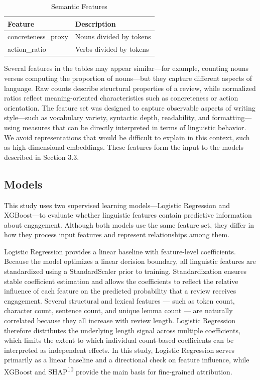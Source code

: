 \documentclass[12pt]{article}
\begin{document}
\begin{longtable}{ll}
\caption{Semantic Features} \\
\textbf{Feature} & \textbf{Description} \\
\hline
concreteness\_proxy & Nouns divided by tokens \\
action\_ratio & Verbs divided by tokens \\
\end{longtable}

Several features in the tables may appear similar—for example, counting nouns versus computing the proportion of nouns—but they capture different aspects of language. Raw counts describe structural properties of a review, while normalized ratios reflect meaning-oriented characteristics such as concreteness or action orientation. The feature set was designed to capture observable aspects of writing style—such as vocabulary variety, syntactic depth, readability, and formatting—using measures that can be directly interpreted in terms of linguistic behavior. We avoid representations that would be difficult to explain in this context, such as high-dimensional embeddings. These features form the input to the models described in Section 3.3.

\subsection{Models}

This study uses two supervised learning models—Logistic Regression and XGBoost—to evaluate whether linguistic features contain predictive information about engagement. Although both models use the same feature set, they differ in how they process input features and represent relationships among them.

Logistic Regression provides a linear baseline with feature-level coefficients. Because the model optimizes a linear decision boundary, all linguistic features are standardized using a StandardScaler prior to training. Standardization ensures stable coefficient estimation and allows the coefficients to reflect the relative influence of each feature on the predicted probability that a review receives engagement.
Several structural and lexical features — such as token count, character count, sentence count, and unique lemma count — are naturally correlated because they all increase with review length. Logistic Regression therefore distributes the underlying length signal across multiple coefficients, which limits the extent to which individual count-based coefficients can be interpreted as independent effects. In this study, Logistic Regression serves primarily as a linear baseline and a directional check on feature influence, while XGBoost and SHAP\textsuperscript{10} provide the main basis for fine-grained attribution. 
\end{document}
